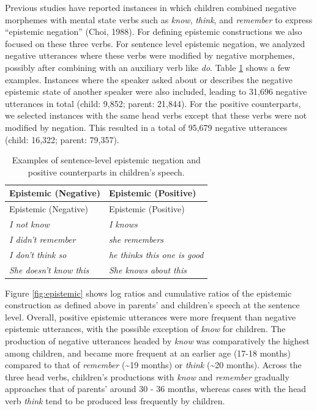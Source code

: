 \documentclass[
  english,
  man,floatsintext]{apa6}
\begin{document}
Previous studies have reported instances in which children combined negative morphemes with mental state verbs such as \emph{know}, \emph{think}, and \emph{remember} to express ``epistemic negation'' (Choi, 1988). For defining epistemic constructions we also focused on these three verbs. For sentence level epistemic negation, we analyzed negative utterances where these verbs were modified by negative morphemes, possibly after combining with an auxiliary verb like \emph{do}. Table \ref{tab:epistem} shows a few examples. Instances where the speaker asked about or describes the negative epistemic state of another speaker were also included, leading to 31,696 negative utterances in total (child: 9,852; parent: 21,844). For the positive counterparts, we selected instances with the same head verbs except that these verbs were not modified by negation. This resulted in a total of 95,679 negative utterances (child: 16,322; parent: 79,357).

\begin{longtable}[]{@{}ll@{}}
\caption{\label{tab:epistem} Examples of sentence-level epistemic negation and positive counterparts in children's speech.}\tabularnewline
\toprule
Epistemic (Negative) & Epistemic (Positive) \\
\midrule
\endfirsthead
\toprule
Epistemic (Negative) & Epistemic (Positive) \\
\midrule
\endhead
\emph{I not know} & \emph{I knows} \\
\emph{I didn't remember} & \emph{she remembers} \\
\emph{I don't think so} & \emph{he thinks this one is good} \\
\emph{She doesn't know this} & \emph{She knows about this} \\
\bottomrule
\end{longtable}

Figure \ref{fig:epistemic} shows log ratios and cumulative ratios of the epistemic construction as defined above in parents' and children's speech at the sentence level. Overall, positive epistemic utterances were more frequent than negative epistemic utterances, with the possible exception of \emph{know} for children. The production of negative utterances headed by \emph{know} was comparatively the highest among children, and became more frequent at an earlier age (17-18 months) compared to that of \emph{remember} (\textasciitilde19 months) or \emph{think} (\textasciitilde20 months). Across the three head verbs, children's productions with \emph{know} and \emph{remember} gradually approaches that of parents' around 30 - 36 months, whereas cases with the head verb \emph{think} tend to be produced less frequently by children.
\end{document}
